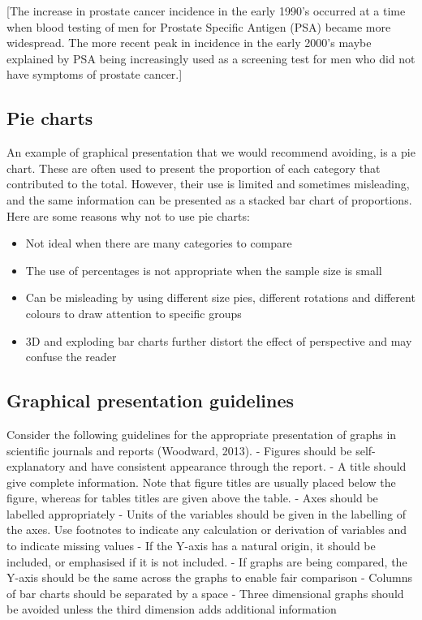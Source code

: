 \documentclass[
]{memoir}
\providecommand{\tightlist}{%
  \setlength{\itemsep}{0pt}\setlength{\parskip}{0pt}}
\begin{document}
{[}The increase in prostate cancer incidence in the early 1990's occurred at a time when blood testing of men for Prostate Specific Antigen (PSA) became more widespread. The more recent peak in incidence in the early 2000's maybe explained by PSA being increasingly used as a screening test for men who did not have symptoms of prostate cancer.{]}

\hypertarget{pie-charts}{%
\subsection{Pie charts}\label{pie-charts}}

An example of graphical presentation that we would recommend avoiding, is a pie chart. These are often used to present the proportion of each category that contributed to the total. However, their use is limited and sometimes misleading, and the same information can be presented as a stacked bar chart of proportions. Here are some reasons why not to use pie charts:

\begin{itemize}
\tightlist
\item
  Not ideal when there are many categories to compare
\item
  The use of percentages is not appropriate when the sample size is small
\item
  Can be misleading by using different size pies, different rotations and different colours to draw attention to specific groups
\item
  3D and exploding bar charts further distort the effect of perspective and may confuse the reader
\end{itemize}

\hypertarget{graphical-presentation-guidelines}{%
\subsection{Graphical presentation guidelines}\label{graphical-presentation-guidelines}}

Consider the following guidelines for the appropriate presentation of graphs in scientific journals and reports (Woodward, 2013).
- Figures should be self-explanatory and have consistent appearance through the report.
- A title should give complete information. Note that figure titles are usually placed below the figure, whereas for tables titles are given above the table.
- Axes should be labelled appropriately
- Units of the variables should be given in the labelling of the axes. Use footnotes to indicate any calculation or derivation of variables and to indicate missing values
- If the Y-axis has a natural origin, it should be included, or emphasised if it is not included.
- If graphs are being compared, the Y-axis should be the same across the graphs to enable fair comparison
- Columns of bar charts should be separated by a space
- Three dimensional graphs should be avoided unless the third dimension adds additional information
\end{document}
